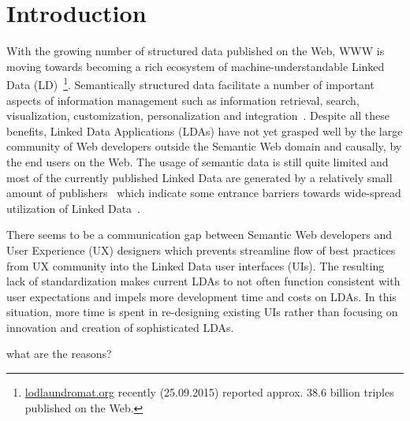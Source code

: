 \documentclass{acm_proc_article-sp}
\begin{document}




\section{Introduction}


With the growing number of structured data published on the Web, WWW is moving towards becoming a rich ecosystem of machine-understandable Linked Data (LD)~\footnote{\url{lodlaundromat.org} recently (25.09.2015) reported approx. 38.6 billion triples published on the Web.}.
Semantically structured data facilitate a number of important aspects of
information management such as information retrieval, search, visualization,  customization, personalization and integration~\cite{SCAJ-Khalili-2013}.
Despite all these benefits, Linked Data Applications (LDAs) have not yet grasped well by the large community of Web developers outside the Semantic Web domain and causally, by the end users on the Web.
The usage of semantic data is still quite limited and most of the currently published Linked Data are generated by a relatively small amount of publishers~\cite{ontowiki-swj} which indicate some entrance barriers towards wide-spread utilization of Linked Data~\cite{StegemannZ14}.

There seems to be a communication gap between Semantic Web developers and User Experience (UX) designers which prevents streamline flow of best practices from UX community into the Linked Data user interfaces (UIs).
The resulting lack of standardization makes current LDAs to not often function consistent with user expectations and impels more development time and costs on LDAs.
In this situation, more time is spent in re-designing existing UIs rather than focusing on innovation and creation of sophisticated LDAs.

what are the reasons?\cite{Norman2013}
 
\end{document}
